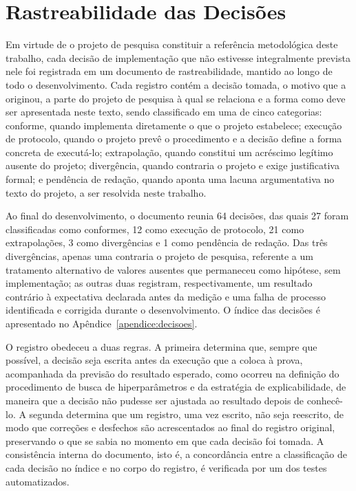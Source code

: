 \section{Rastreabilidade das Decisões}\label{sec:rastreabilidade}
Em virtude de o projeto de pesquisa constituir a referência metodológica deste trabalho, cada decisão de implementação que não estivesse integralmente prevista nele foi registrada em um documento de rastreabilidade, mantido ao longo de todo o desenvolvimento. Cada registro contém a decisão tomada, o motivo que a originou, a parte do projeto de pesquisa à qual se relaciona e a forma como deve ser apresentada neste texto, sendo classificado em uma de cinco categorias: conforme, quando implementa diretamente o que o projeto estabelece; execução de protocolo, quando o projeto prevê o procedimento e a decisão define a forma concreta de executá-lo; extrapolação, quando constitui um acréscimo legítimo ausente do projeto; divergência, quando contraria o projeto e exige justificativa formal; e pendência de redação, quando aponta uma lacuna argumentativa no texto do projeto, a ser resolvida neste trabalho.

Ao final do desenvolvimento, o documento reunia 64 decisões, das quais 27 foram classificadas como conformes, 12 como execução de protocolo, 21 como extrapolações, 3 como divergências e 1 como pendência de redação. Das três divergências, apenas uma contraria o projeto de pesquisa, referente a um tratamento alternativo de valores ausentes que permaneceu como hipótese, sem implementação; as outras duas registram, respectivamente, um resultado contrário à expectativa declarada antes da medição e uma falha de processo identificada e corrigida durante o desenvolvimento. O índice das decisões é apresentado no Apêndice~\ref{apendice:decisoes}.

O registro obedeceu a duas regras. A primeira determina que, sempre que possível, a decisão seja escrita antes da execução que a coloca à prova, acompanhada da previsão do resultado esperado, como ocorreu na definição do procedimento de busca de hiperparâmetros e da estratégia de explicabilidade, de maneira que a decisão não pudesse ser ajustada ao resultado depois de conhecê-lo. A segunda determina que um registro, uma vez escrito, não seja reescrito, de modo que correções e desfechos são acrescentados ao final do registro original, preservando o que se sabia no momento em que cada decisão foi tomada. A consistência interna do documento, isto é, a concordância entre a classificação de cada decisão no índice e no corpo do registro, é verificada por um dos testes automatizados.

